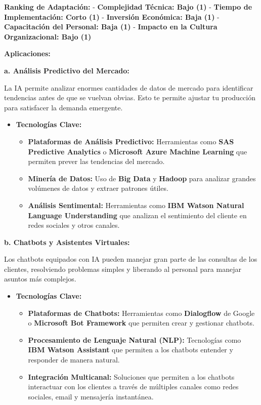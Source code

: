 \documentclass[
  letterpaper,
]{book}
\providecommand{\tightlist}{%
  \setlength{\itemsep}{0pt}\setlength{\parskip}{0pt}}\usepackage{longtable,booktabs,array}
\begin{document}
\textbf{Ranking de Adaptación:} - \textbf{Complejidad Técnica: Bajo (1)}
- \textbf{Tiempo de Implementación: Corto (1)} - \textbf{Inversión
Económica: Baja (1)} - \textbf{Capacitación del Personal: Baja (1)} -
\textbf{Impacto en la Cultura Organizacional: Bajo (1)}

\textbf{Aplicaciones:}

\textbf{a. Análisis Predictivo del Mercado:}

La IA permite analizar enormes cantidades de datos de mercado para
identificar tendencias antes de que se vuelvan obvias. Esto te permite
ajustar tu producción para satisfacer la demanda emergente.

\begin{itemize}
\tightlist
\item
  \textbf{Tecnologías Clave:}

  \begin{itemize}
  \tightlist
  \item
    \textbf{Plataformas de Análisis Predictivo:} Herramientas como
    \textbf{SAS Predictive Analytics} o \textbf{Microsoft Azure Machine
    Learning} que permiten prever las tendencias del mercado.
  \item
    \textbf{Minería de Datos:} Uso de \textbf{Big Data} y
    \textbf{Hadoop} para analizar grandes volúmenes de datos y extraer
    patrones útiles.
  \item
    \textbf{Análisis Sentimental:} Herramientas como \textbf{IBM Watson
    Natural Language Understanding} que analizan el sentimiento del
    cliente en redes sociales y otros canales.
  \end{itemize}
\end{itemize}

\textbf{b. Chatbots y Asistentes Virtuales:}

Los chatbots equipados con IA pueden manejar gran parte de las consultas
de los clientes, resolviendo problemas simples y liberando al personal
para manejar asuntos más complejos.

\begin{itemize}
\tightlist
\item
  \textbf{Tecnologías Clave:}

  \begin{itemize}
  \tightlist
  \item
    \textbf{Plataformas de Chatbots:} Herramientas como
    \textbf{Dialogflow} de Google o \textbf{Microsoft Bot Framework} que
    permiten crear y gestionar chatbots.
  \item
    \textbf{Procesamiento de Lenguaje Natural (NLP):} Tecnologías como
    \textbf{IBM Watson Assistant} que permiten a los chatbots entender y
    responder de manera natural.
  \item
    \textbf{Integración Multicanal:} Soluciones que permiten a los
    chatbots interactuar con los clientes a través de múltiples canales
    como redes sociales, email y mensajería instantánea.
  \end{itemize}
\end{itemize}
\end{document}
